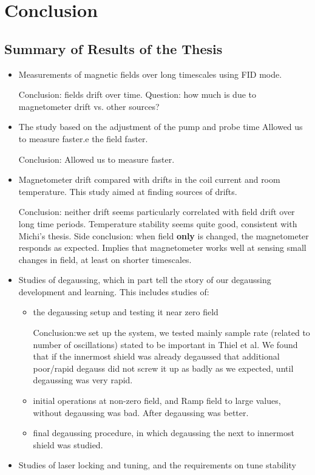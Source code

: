 \chapter{Conclusion\label{ch:conclusion}}
\section{Summary of Results of the Thesis}
\begin{itemize}
\item Measurements of magnetic fields over long timescales using FID mode.

Conclusion: fields drift over time.  Question: how much is due to
 magnetometer drift vs. other sources?

\item The study based on the adjustment of the pump and probe time Allowed us to measure faster.e the field faster.
  
Conclusion: Allowed us to measure faster.
\item Magnetometer drift compared with drifts in the coil current and
  room temperature.  This study aimed at finding sources of drifts.
  
Conclusion: neither drift seems
particularly correlated with field drift over long time periods.
 Temperature stability seems quite good, consistent with Michi's
 thesis.  Side conclusion: when field {\bf only} is changed, the
 magnetometer responds as expected.  Implies that magnetometer works
 well at sensing small changes in field, at least on shorter
 timescales.
\item Studies of degaussing, which in part tell the story of our
  degaussing development and learning.  This includes studies of:
  \begin{itemize}
    \item the degaussing setup and testing it near zero field
    
Conclusion:we set up the
     system, we tested mainly sample rate (related to number of
     oscillations) stated to be important in Thiel et al.\cite{doi:10.1063/1.2713433}  We found
     that if the innermost shield was already degaussed that
     additional poor/rapid degauss did not screw it up as badly as we
     expected, until degaussing was very rapid.
    \item initial operations at non-zero field, and
Ramp field to large values, without
    degaussing was bad.  After degaussing was better.
    
    \item final degaussing procedure, in which degaussing the next to
      innermost shield was studied.
  \end{itemize}
\item Studies of laser locking and tuning, and the requirements on
  tune stability
  \end{itemize}
